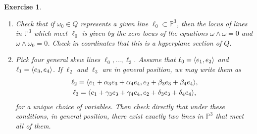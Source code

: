 \documentclass{article}
\newtheorem{ex}{Exercise}
\theoremstyle{nonumberplain}
\newcommand{\PP}{\mathbb{P}}
\DeclarePairedDelimiter{\braket}{\langle}{\rangle}
\begin{document}
\begin{ex}
\leavevmode
\begin{enumerate}
\item Check that if $\omega_0 \in Q$ represents a given line $\ell_0 \subset \PP^3$, then the locus of lines in $\PP^3$ which meet $\ell_0$ is given by the zero locus of the equations $\omega \wedge \omega = 0$ and $\omega \wedge \omega_0 = 0$. Check in coordinates that this is a hyperplane section of $Q$.

\item Pick four general skew lines $\ell_0, \dots, \ell_3$. Assume that $\ell_0 = \braket{e_1, e_2}$ and $\ell_1 = \braket{e_3, e_4}$. If $\ell_2$ and $\ell_3$ are in general position, we may write them as
\begin{equation}\label{eq:gp}
\begin{gathered}
\ell_2 = \braket{e_1 + \alpha_3 e_3 + \alpha_4 e_4, e_2 + \beta_3 e_3 + \beta_4 e_4},\\
\ell_3 = \braket{e_1 + \gamma_3 e_3 + \gamma_4 e_4, e_2 + \delta_3 e_3 + \delta_4 e_4},
\end{gathered}
\end{equation}
for a unique choice of variables. Then check directly that under these conditions, in general position, there exist exactly two lines in $\PP^3$ that meet all of them.
\end{enumerate}
\end{ex}
\end{document}
